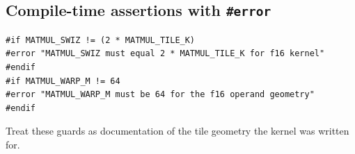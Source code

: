 \subsection*{Compile-time assertions with \texttt{\#error}}

\begin{lstlisting}[language=croqtile,caption={Compile-time assertions with error}]
#if MATMUL_SWIZ != (2 * MATMUL_TILE_K)
#error "MATMUL_SWIZ must equal 2 * MATMUL_TILE_K for f16 kernel"
#endif
#if MATMUL_WARP_M != 64
#error "MATMUL_WARP_M must be 64 for the f16 operand geometry"
#endif
\end{lstlisting}

Treat these guards as documentation of the tile geometry the kernel was written for.
